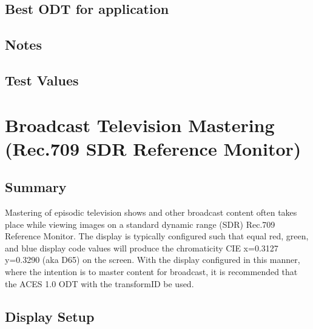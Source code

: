 \subsection{Best ODT for application}
\label{subsec:bestODT-iPad-d60sim}

\subsection{Notes}
\label{subsec:notes-iPad-d60sim}

\subsection{Test Values}
\label{subsec:testValues-iPad-d60sim}


\clearpage
\section{Broadcast Television Mastering (Rec.709 SDR Reference Monitor)}
\label{sec:ot-app-rec709}

\subsection{Summary}
\label{subsec:summary-rec709}

Mastering of episodic television shows and other broadcast content often takes place while viewing images on a standard dynamic range (SDR) Rec.709  Reference Monitor. The display is typically configured such that equal red, green, and blue display code values will produce the chromaticity CIE x=0.3127 y=0.3290 (aka D65) on the screen. With the display
configured in this manner, where the intention is to master content for broadcast, it is recommended that the ACES 1.0 ODT with the transformID \texttt{} be used.

\subsection{Display Setup}
\label{subsec:setup-rec709}

